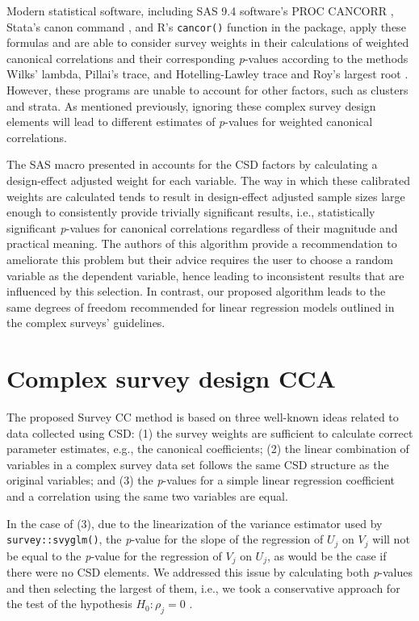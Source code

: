 Modern statistical software, including SAS 9.4 software's PROC CANCORR \citep{sas2012}, Stata's canon command \citep{stata2023}, and R's \texttt{cancor()} function in the  package, apply these formulas and are able to consider survey weights in their calculations of weighted canonical correlations and their corresponding \emph{p}-values according to the methods Wilks' lambda, Pillai's trace, and Hotelling-Lawley trace \citep{cal2006} and Roy's largest root \citep{johnstone2009}. However, these programs are unable to account for other factors, such as clusters and strata. As mentioned previously, ignoring these complex survey design elements will lead to different estimates of \emph{p}-values for weighted canonical correlations.

The SAS macro presented in \citep{Nelson2020SURVEYCORRCOVMC} accounts for the CSD factors by calculating a design-effect adjusted weight for each variable. The way in which these calibrated weights are calculated tends to result in design-effect adjusted sample sizes large enough to consistently provide trivially significant results, i.e., statistically significant \emph{p}-values for canonical correlations regardless of their magnitude and practical meaning. The authors of this algorithm provide a recommendation to ameliorate this problem but their advice requires the user to choose a random variable as the dependent variable, hence leading to inconsistent results that are influenced by this selection. In contrast, our proposed algorithm leads to the same degrees of freedom recommended for linear regression models outlined in the complex surveys' guidelines.

\hypertarget{complex-survey-design-cca}{%
\section{Complex survey design CCA}\label{complex-survey-design-cca}}

The proposed Survey CC method is based on three well-known ideas related to data collected using CSD: (1) the survey weights are sufficient to calculate correct parameter estimates, e.g., the canonical coefficients; (2) the linear combination of variables in a complex survey data set follows the same CSD structure as the original variables; and (3) the \emph{p}-values for a simple linear regression coefficient and a correlation using the same two variables are equal.

In the case of (3), due to the linearization of the variance estimator used by \texttt{survey::svyglm()}, the \emph{p}-value for the slope of the regression of \(U_j\) on \(V_j\) will not be equal to the \emph{p}-value for the regression of \(V_j\) on \(U_j\), as would be the case if there were no CSD elements. We addressed this issue by calculating both \emph{p}-values and then selecting the largest of them, i.e., we took a conservative approach for the test of the hypothesis \(H_0:\rho_j=0\) \citep{Nelson2020SURVEYCORRCOVMC}.

